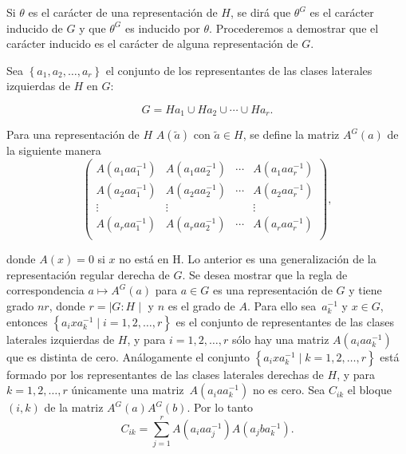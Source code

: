 \documentclass[12pt]{book}
\theoremstyle{definition}
\newcounter{in}
\begin{document}
Si $\theta$ es el carácter de una representación de $H$, se dirá que
$\theta^{G}$ es el carácter inducido de $G$ y que $\theta^{G}$ es
inducido por $\theta$. Procederemos a demostrar que el carácter
inducido es el carácter de alguna representación de $G$.

Sea $\left\{ a_{1}, a_{2},\ldots,a_{r}\right\}$ el conjunto de los
representantes de las clases laterales izquierdas de $H$ en $G$:

\begin{equation}
  \label{eq:61}
  G = Ha_{1} \cup Ha_{2} \cup \cdots \cup Ha_{r}.
\end{equation}

Para una representación de $H$ $A(\tilde{a})$ con $\tilde{a} \in H$,
se define la matriz $A^{G}(a)$ de la siguiente manera
\begin{equation}
  \label{eq:62}
  \begin{pmatrix}
    A(a_{1} a a_{1}^{-1}) & A(a_{1} a a_{2}^{-1}) & \cdots &  A(a_{1} a a_{r}^{-1}) \\
    A(a_{2} a a_{1}^{-1}) & A(a_{2} a a_{2}^{-1}) & \cdots &  A(a_{2} a a_{r}^{-1}) \\
    \vdots & \vdots &  & \vdots \\ 
    A(a_{r} a a_{1}^{-1}) & A(a_{r} a a_{2}^{-1}) & \cdots &  A(a_{r} a a_{r}^{-1}) \\
  \end{pmatrix}
  ,
\end{equation}

donde $A(x)=0$ si $x$ no está en H. Lo anterior es una generalización
de la representación regular derecha de $G$. Se desea mostrar que la
regla de correspondencia $a \mapsto A^{G}(a)$ para $a \in G$ es una
representación de $G$ y tiene grado $nr$, donde $r= \mid G : H \mid$ y
$n$ es el grado de $A$. Para ello sea~$a_{k}^{-1}$ y $x \in G$,
entonces
$\left\{ a_{i} x a_{k}^{-1} \mid i = 1, 2, \ldots, r \right\}$ es el
conjunto de representantes de las clases laterales izquierdas de $H$,
y para $i = 1, 2, \ldots, r$ sólo hay una matriz
$A(a_{i} a a_{k}^{-1})$ que es distinta de cero. Análogamente el
conjunto
$\left\{ a_{i} x a_{k}^{-1} \mid k = 1, 2, \ldots, r \right\}$ está
formado por los representantes de las clases laterales derechas de
$H$, y para $ k = 1, 2, \ldots, r$ únicamente una
matriz~$A(a_{i} a a_{k}^{-1})$ no es cero. Sea $C_{ik}$ el bloque
$(i,k)$ de la matriz $A^{G}(a)A^{G}(b)$. Por lo tanto
\begin{equation}
  \label{eq:63}
  C_{ik} = \sum_{j=1}^{r} A(a_{i} a a_{j}^{-1}) A(a_{j} b a_{k}^{-1}).
\end{equation}
\end{document}
